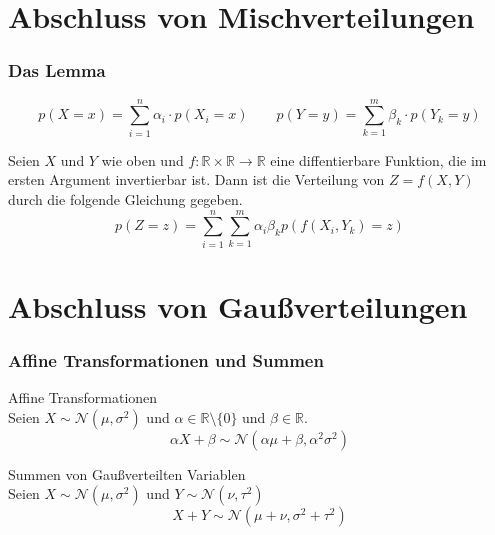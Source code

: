 \documentclass[11pt]{beamer}
\begin{document}
\section{Abschluss von Mischverteilungen}

\begin{frame}
  \frametitle{Das Lemma}
  \begin{equation*}
    p(X = x) = \sum_{i = 1}^{n} \alpha_{i} \cdot p(X_{i} = x) \qquad p(Y = y) = \sum_{k = 1}^{m} \beta_{k} \cdot p(Y_{k} = y)
  \end{equation*}
  \vspace{1.5em}
  \begin{lemma}
    Seien $X$ und $Y$ wie oben und
    $f : \mathbb{R} \times \mathbb{R} \rightarrow \mathbb{R}$ eine
    diffentierbare Funktion, die im ersten Argument invertierbar ist. Dann ist
    die Verteilung von $Z = f(X, Y)$ durch die folgende Gleichung gegeben.
    \begin{equation*}
      p(Z = z) = \sum_{i = 1}^{n} \sum_{k = 1}^{m} \alpha_{i} \beta_{k} p(f(X_{i}, Y_{k}) = z)
    \end{equation*}
  \end{lemma}
\end{frame}

\section{Abschluss von Gaußverteilungen}

\begin{frame}
  \frametitle{Affine Transformationen und Summen}

  {\Large Affine Transformationen}\\
  \vspace{1em}
  Seien $X \sim \mathcal{N}(\mu, \sigma^{2})$ und
  $\alpha \in \mathbb{R} \setminus \{ 0 \}$ und $\beta \in \mathbb{R}$.
  \begin{equation*}
    \alpha X + \beta \sim \mathcal{N}(\alpha \mu + \beta, \alpha^{2}\sigma^{2})
  \end{equation*}

  \vspace{3em}

  {\Large Summen von Gaußverteilten Variablen}\\
  \vspace{1em}
  Seien $X \sim \mathcal{N}(\mu, \sigma^{2})$ und $Y \sim \mathcal{N}(\nu, \tau^{2})$
  \begin{equation*}
    X + Y \sim \mathcal{N}(\mu + \nu, \sigma^{2} + \tau^{2})
  \end{equation*}
\end{frame}
\end{document}
